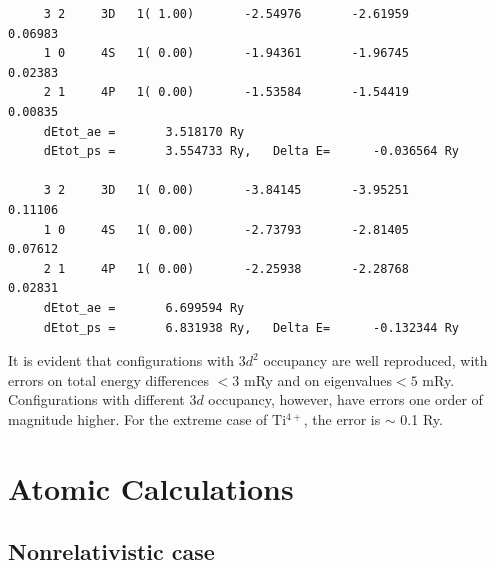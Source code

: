 \documentclass[12pt,a4paper]{article}
\begin{document}
\begin{verbatim}
     3 2     3D   1( 1.00)       -2.54976       -2.61959        0.06983
     1 0     4S   1( 0.00)       -1.94361       -1.96745        0.02383
     2 1     4P   1( 0.00)       -1.53584       -1.54419        0.00835
     dEtot_ae =       3.518170 Ry
     dEtot_ps =       3.554733 Ry,   Delta E=      -0.036564 Ry
 
     3 2     3D   1( 0.00)       -3.84145       -3.95251        0.11106
     1 0     4S   1( 0.00)       -2.73793       -2.81405        0.07612
     2 1     4P   1( 0.00)       -2.25938       -2.28768        0.02831
     dEtot_ae =       6.699594 Ry
     dEtot_ps =       6.831938 Ry,   Delta E=      -0.132344 Ry
\end{verbatim} 
It is evident that configurations with $3d^2$ occupancy are well 
reproduced, with errors on total energy differences $<3$ mRy and
on eigenvalues$<5$ mRy. Configurations with different $3d$ occupancy,
however, have errors one order of magnitude higher. For the extreme
case of Ti$^{4+}$, the error is $\sim$ 0.1 Ry.

\newpage



\appendix

\section{Atomic Calculations}

\subsection{Nonrelativistic case}
\end{document}

